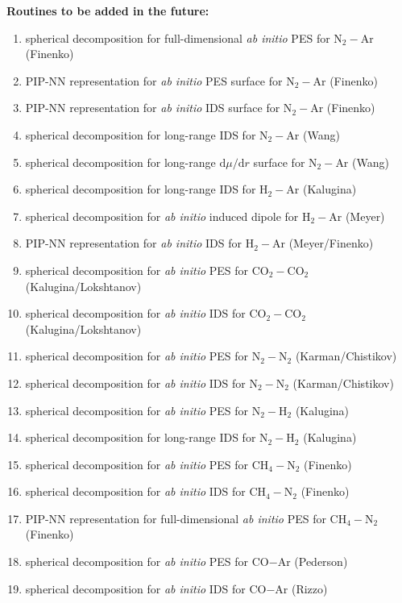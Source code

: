 \documentclass{article}
\begin{document}
\noindent
{\textbf{Routines to be added in the future:}}
\begin{enumerate}
\item spherical decomposition for full-dimensional \textit{ab initio} PES for N$_2-$Ar (Finenko)
\item PIP-NN representation for \textit{ab initio} PES surface for N$_2-$Ar (Finenko)
\item PIP-NN representation for \textit{ab initio} IDS surface for N$_2-$Ar (Finenko)
\item spherical decomposition for long-range IDS for N$_2-$Ar (Wang)
\item spherical decomposition for long-range $\textrm{d}\mu/\textrm{d}r$ surface for N$_2-$Ar (Wang)
\item spherical decomposition for long-range IDS for H$_2-$Ar (Kalugina)
\item spherical decomposition for \textit{ab initio} induced dipole for H$_2-$Ar (Meyer)
\item PIP-NN representation for \textit{ab initio} IDS for H$_2-$Ar (Meyer/Finenko)
\item spherical decomposition for \textit{ab initio} PES for CO$_2-$CO$_2$ (Kalugina/Lokshtanov)
\item spherical decomposition for \textit{ab initio} IDS for CO$_2-$CO$_2$ (Kalugina/Lokshtanov)
\item spherical decomposition for \textit{ab initio} PES for N$_2-$N$_2$ (Karman/Chistikov)
\item spherical decomposition for \textit{ab initio} IDS for N$_2-$N$_2$ (Karman/Chistikov)
\item spherical decomposition for \textit{ab initio} PES for N$_2-$H$_2$ (Kalugina)
\item spherical decomposition for long-range IDS for N$_2-$H$_2$ (Kalugina)
\item spherical decomposition for \textit{ab initio} PES for CH$_4-$N$_2$ (Finenko)
\item spherical decomposition for \textit{ab initio} IDS for CH$_4-$N$_2$ (Finenko)
\item PIP-NN representation for full-dimensional \textit{ab initio} PES for CH$_4-$N$_2$ (Finenko)
\item spherical decomposition for \textit{ab initio} PES for CO$-$Ar (Pederson)
\item spherical decomposition for \textit{ab initio} IDS for CO$-$Ar (Rizzo)
\end{enumerate}
\end{document}
